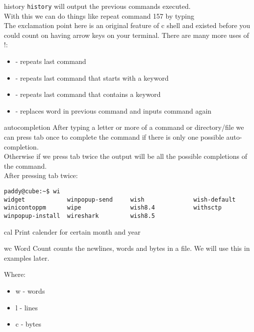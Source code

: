 \documentclass{beamer}
\begin{document}
\begin{frame}{history}
\texttt{history} will output the previous commands executed.\\
With this we can do things like repeat command 157 by typing \\
The exclamation point here is an original feature of c shell and existed before you could count on having arrow keys on your terminal. There are many more uses of !:
\begin{itemize}
    \item \fbox{\texttt{!!}} - repeats last command
    \item {} - repeats last command that starts with a keyword
    \item {} - repeats last command that contains a keyword
    \item {} - replaces word in previous command and inputs command again
\end{itemize}

\end{frame}
\begin{frame}[fragile]{autocompletion}
After typing a letter or more of a command or directory/file we can press tab once to complete the command if there is only one possible auto-completion.\\Otherwise if we press tab twice the output will be all the possible completions of the command.\\After pressing tab twice: 
\begin{verbatim}paddy@cube:~$ wi
widget            winpopup-send     wish              wish-default
winicontoppm      wipe              wish8.4           withsctp
winpopup-install  wireshark         wish8.5
\end{verbatim}

\end{frame}
\begin{frame}{cal}
Print calender for certain month and year\\
\begin{center}
\end{center}

\end{frame}

\begin{frame}{wc}
Word Count counts the newlines, words and bytes in a file. We will use this in examples later.\\
\begin{center}
\end{center}
Where:
\begin{itemize}
    \item w - words
    \item l - lines
    \item c - bytes
\end{itemize}
\end{frame}
\end{document}
